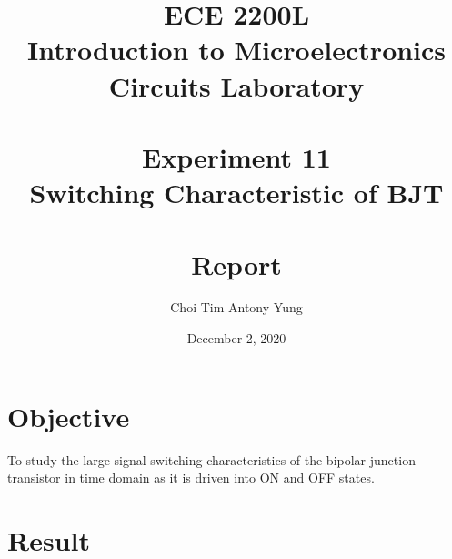 \documentclass{article}
\title{ECE 2200L\\Introduction to Microelectronics Circuits Laboratory\\\,\\Experiment 11\\Switching Characteristic of BJT\\\,\\Report}
\author{Choi Tim Antony Yung}
\date{December 2, 2020}
\begin{document}
\maketitle

\thispagestyle{empty}
\setcounter{page}{0}

\newpage

\section*{Objective}
To study the large signal switching characteristics of the bipolar junction transistor in time domain as it is driven into ON and OFF states.
\section*{Result}
\end{document}
